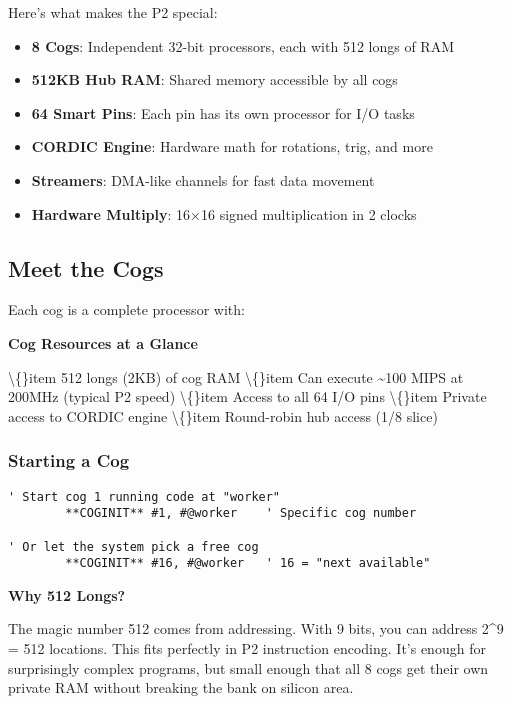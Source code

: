 \documentclass[11pt]{book}
\providecommand{\tightlist}{%
  \setlength{\itemsep}{0pt}\setlength{\parskip}{0pt}}
\begin{document}
Here's what makes the P2 special:

\begin{itemize}
\tightlist
\item
  \textbf{8 Cogs}: Independent 32-bit processors, each with 512 longs of
  RAM
\item
  \textbf{512KB Hub RAM}: Shared memory accessible by all cogs
\item
  \textbf{64 Smart Pins}: Each pin has its own processor for I/O tasks
\item
  \textbf{CORDIC Engine}: Hardware math for rotations, trig, and more
\item
  \textbf{Streamers}: DMA-like channels for fast data movement
\item
  \textbf{Hardware Multiply}: 16×16 signed multiplication in 2 clocks
\end{itemize}

\hypertarget{meet-the-cogs}{%
\subsection{Meet the Cogs}\label{meet-the-cogs}}

Each cog is a complete processor with:

\begin{sidetrack}
\textbf{Cog Resources at a Glance}
\begin{itemize}
\textbackslash\{\}item 512 longs (2KB) of cog RAM
\textbackslash\{\}item Can execute \textasciitilde{}100 MIPS at 200MHz (typical P2 speed)
\textbackslash\{\}item Access to all 64 I/O pins
\textbackslash\{\}item Private access to CORDIC engine
\textbackslash\{\}item Round-robin hub access (1/8 slice)
\end{itemize}
\end{sidetrack}

\hypertarget{starting-a-cog}{%
\subsubsection{Starting a Cog}\label{starting-a-cog}}

\begin{lstlisting}
' Start cog 1 running code at "worker"
        **COGINIT** #1, #@worker    ' Specific cog number
        
' Or let the system pick a free cog
        **COGINIT** #16, #@worker   ' 16 = "next available"
\end{lstlisting}

\begin{sidetrack}
\textbf{Why 512 Longs?}

The magic number 512 comes from addressing. With 9 bits, you can address 2\^{}9 = 512 locations. This fits perfectly in P2 instruction encoding. It's enough for surprisingly complex programs, but small enough that all 8 cogs get their own private RAM without breaking the bank on silicon area.
\end{sidetrack}
\end{document}
